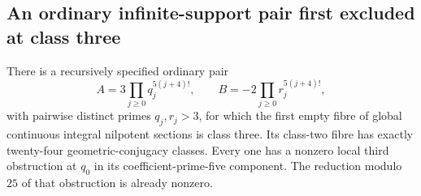 \subsection{An ordinary infinite-support pair first excluded at class three}
\label{sec:ghost-class3-example}

\begin{theorem}
\label{thm:ghost-first-integral-class3}
There is a recursively specified ordinary pair
\[
 A=3\prod_{j\ge0}q_j^{5(j+4)!},\qquad
 B=-2\prod_{j\ge0}r_j^{5(j+4)!},
\]
with pairwise distinct primes \(q_j,r_j>3\), for which
the first empty fibre of global continuous integral
nilpotent sections is class three. Its class-two fibre
has exactly twenty-four geometric-conjugacy classes.
Every one has a nonzero local third obstruction at
\(q_0\) in its coefficient-prime-five component.
The reduction modulo \(25\) of that obstruction is
already nonzero.
\end{theorem}
